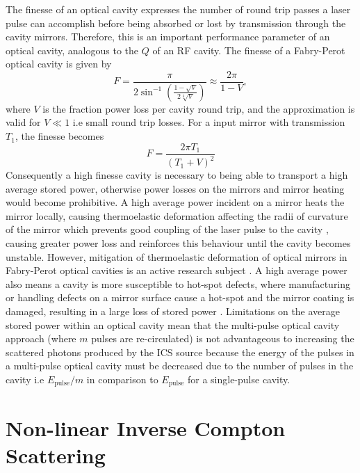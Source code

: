 \documentclass[../main.tex]{subfiles}
\begin{document}
The finesse of an optical cavity expresses the number of round trip passes a laser pulse can accomplish before being absorbed or lost by transmission through the cavity mirrors. Therefore, this is an important performance parameter of an optical cavity, analogous to the $Q$ of an RF cavity. The finesse of a Fabry-Perot optical cavity is given by \cite{ismail2016fabry}
\begin{equation}
F=\frac{\pi}{2\sin^{-1}\left(\frac{1-\sqrt{V}}{2\sqrt[4]{V}}\right)} \approx \frac{2\pi}{1-V},
\label{eq:finesse}    
\end{equation}
where $V$ is the fraction power loss per cavity round trip, and the approximation is valid for $V \ll 1$ i.e small round trip losses. For a input mirror with transmission $T_{1}$, the finesse becomes
\begin{equation}
F=\frac{2\pi T_{1}}{\left(T_{1}+V\right)^{2}}
\label{eq:fabry_perot_finesse}    
\end{equation}
Consequently a high finesse cavity is necessary to being able to transport a high average stored power, otherwise power losses on the mirrors and mirror heating would become prohibitive. A high average power incident on a mirror heats the mirror locally, causing thermoelastic deformation affecting the radii of curvature of the mirror which prevents good coupling of the laser pulse to the cavity \cite{chaikovska2016high}, causing greater power loss and reinforces this behaviour until the cavity becomes unstable. However, mitigation of thermoelastic deformation of optical mirrors in Fabry-Perot optical cavities is an active research subject \cite{amoudry2020modal}. A high average power also means a cavity is more susceptible to hot-spot defects, where manufacturing or handling defects on a mirror surface cause a hot-spot and the mirror coating is damaged, resulting in a large loss of stored power \cite{wang2020prior}. Limitations on the average stored power within an optical cavity mean that the multi-pulse optical cavity approach (where $m$ pulses are re-circulated) is not advantageous to increasing the scattered photons produced by the ICS source because the energy of the pulses in a multi-pulse optical cavity must be decreased due to the number of pulses in the cavity i.e $E_{\mathrm{pulse}}/m$ in comparison to $E_{\mathrm{pulse}}$ for a single-pulse cavity.    

\section{Non-linear Inverse Compton Scattering}
\label{sec:nonlinear_ICS}
\end{document}
